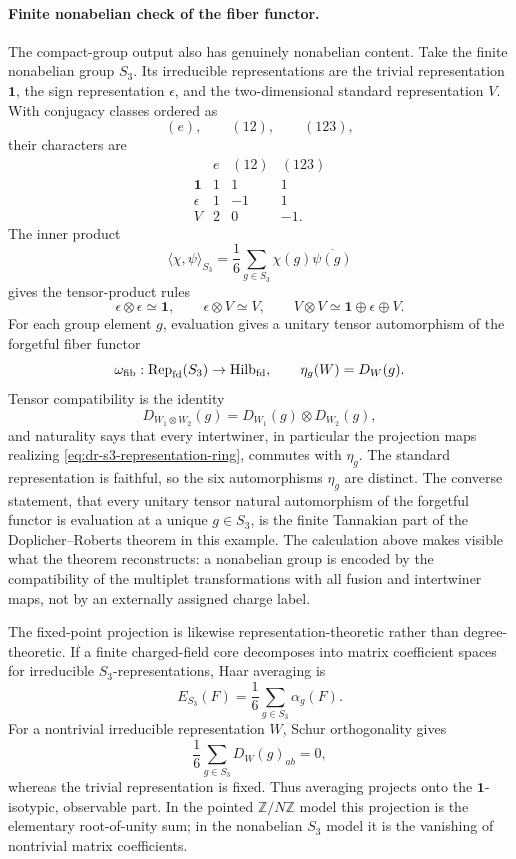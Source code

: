 \paragraph{Finite nonabelian check of the fiber functor.}
The compact-group output also has genuinely nonabelian content.  Take the
finite nonabelian group \(S_3\).  Its irreducible representations are the
trivial representation \(\mathbf 1\), the sign representation \(\epsilon\),
and the two-dimensional standard representation \(V\).  With conjugacy
classes ordered as
\[
  (e),\qquad (12),\qquad (123),
\]
their characters are
\[
\begin{array}{c|ccc}
  & e & (12) & (123)\\ \hline
  \mathbf 1 & 1 & 1 & 1\\
  \epsilon & 1 & -1 & 1\\
  V & 2 & 0 & -1 .
\end{array}
\]
The inner product
\[
  \langle \chi,\psi\rangle_{S_3}
  =
  \frac16\sum_{g\in S_3}\chi(g)\overline{\psi(g)}
\]
gives the tensor-product rules
\begin{equation}
  \epsilon\otimes\epsilon\simeq \mathbf 1,
  \qquad
  \epsilon\otimes V\simeq V,
  \qquad
  V\otimes V\simeq \mathbf 1\oplus\epsilon\oplus V .
  \label{eq:dr-s3-representation-ring}
\end{equation}
For each group element \(g\), evaluation gives a unitary tensor
automorphism of the forgetful fiber functor
\[
  \omega_{\rm fib}:{\rm Rep}_{\rm fd}(S_3)\to{\rm Hilb}_{\rm fd},
  \qquad
  \eta_g(W)=D_W(g).
\]
Tensor compatibility is the identity
\[
  D_{W_1\otimes W_2}(g)=D_{W_1}(g)\otimes D_{W_2}(g),
\]
and naturality says that every intertwiner, in particular the projection
maps realizing \eqref{eq:dr-s3-representation-ring}, commutes with
\(\eta_g\).  The standard representation is faithful, so the six
automorphisms \(\eta_g\) are distinct.  The converse statement, that every
unitary tensor natural automorphism of the forgetful functor is evaluation at
a unique \(g\in S_3\), is the finite Tannakian part of the
Doplicher--Roberts theorem in this example.  The calculation above makes
visible what the theorem reconstructs: a nonabelian group is encoded by the
compatibility of the multiplet transformations with all fusion and
intertwiner maps, not by an externally assigned charge label.

The fixed-point projection is likewise representation-theoretic rather than
degree-theoretic.  If a finite charged-field core decomposes into matrix
coefficient spaces for irreducible \(S_3\)-representations, Haar averaging is
\[
  E_{S_3}(F)
  =
  \frac16\sum_{g\in S_3}\alpha_g(F).
\]
For a nontrivial irreducible representation \(W\), Schur orthogonality gives
\[
  \frac16\sum_{g\in S_3}D_W(g)_{ab}=0,
\]
whereas the trivial representation is fixed.  Thus averaging projects onto
the \(\mathbf1\)-isotypic, observable part.  In the pointed
\(\mathbb Z/N\mathbb Z\) model this projection is the elementary root-of-unity
sum; in the nonabelian \(S_3\) model it is the vanishing of nontrivial matrix
coefficients.

